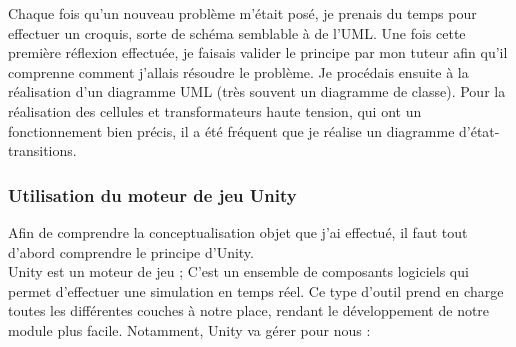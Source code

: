 \documentclass[a4paper]{article}
\begin{document}
    Chaque fois qu'un nouveau problème m'était posé, je prenais du temps pour effectuer un croquis, sorte de schéma semblable à de l'UML. Une fois cette première réflexion effectuée, je faisais valider le principe par mon tuteur afin qu'il comprenne comment j'allais résoudre le problème. Je procédais ensuite à la réalisation d'un diagramme UML (très souvent un diagramme de classe). Pour la réalisation des cellules et transformateurs haute tension, qui ont un fonctionnement bien précis, il a été fréquent que je réalise un diagramme d'état-transitions. \\ 

    \subsubsection{Utilisation du moteur de jeu Unity}

    Afin de comprendre la conceptualisation objet que j'ai effectué, il faut tout d'abord comprendre le principe d'Unity. \\

    Unity est un moteur de jeu ; C'est un ensemble de composants logiciels qui permet d'effectuer une simulation en temps réel. Ce type d'outil prend en charge toutes les différentes couches à notre place, rendant le développement de notre module plus facile. Notamment, Unity va gérer pour nous : \\
    
\end{document}
